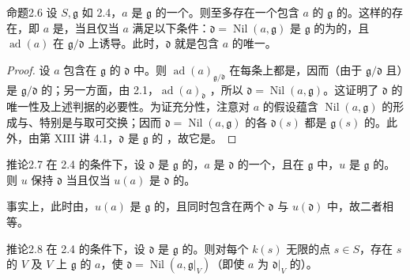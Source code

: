 \begin{SGAresult}{命题}{2.6}
设 $S,\mathfrak g$ 如 2.4，$a$ 是 $\mathfrak g$ 的一个。则至多存在一个包含 $a$ 的 $\mathfrak g$ 的。这样的存在，即 $a$ 是，当且仅当 $a$ 满足以下条件：$\mathfrak d=\operatorname{Nil}(a,\mathfrak g)$ 是 $\mathfrak g$ 的为的，且 $\operatorname{ad}(a)$ 在 $\mathfrak g/\mathfrak d$ 上诱导。此时，$\mathfrak d$ 就是包含 $a$ 的唯一。
\end{SGAresult}
\begin{proof}
设 $a$ 包含在 $\mathfrak g$ 的 $\mathfrak d$ 中。则 $\operatorname{ad}(a)_{\mathfrak g/\mathfrak d}$ 在每条上都是，因而（由于 $\mathfrak g/\mathfrak d$ 且）是 $\mathfrak g/\mathfrak d$ 的；另一方面，由 2.1，$\operatorname{ad}(a)_{\mathfrak d}$ ，所以 $\mathfrak d=\operatorname{Nil}(a,\mathfrak g)$。这证明了 $\mathfrak d$ 的唯一性及上述判据的必要性。为证充分性，注意对 $a$ 的假设蕴含 $\operatorname{Nil}(a,\mathfrak g)$ 的形成与、特别是与取可交换；因而 $\mathfrak d=\operatorname{Nil}(a,\mathfrak g)$ 的各 $\mathfrak d(s)$ 都是 $\mathfrak g(s)$ 的。此外，由第 XIII 讲 4.1，$\mathfrak d$ 是 $\mathfrak g$ 的 ，故它是。
\end{proof}
\begin{SGAresult}{推论}{2.7}
在 2.4 的条件下，设 $\mathfrak d$ 是 $\mathfrak g$ 的，$a$ 是 $\mathfrak d$ 的一个，且在 $\mathfrak g$ 中，$u$ 是 $\mathfrak g$ 的。则 $u$ 保持 $\mathfrak d$ 当且仅当 $u(a)$ 是 $\mathfrak d$ 的。
\end{SGAresult}
事实上，此时由，$u(a)$ 是 $\mathfrak g$ 的，且同时包含在两个 $\mathfrak d$ 与 $u(\mathfrak d)$ 中，故二者相等。
\begin{SGAresult}{推论}{2.8}
在 2.4 的条件下，设 $\mathfrak d$ 是 $\mathfrak g$ 的。则对每个 $k(s)$ 无限的点 $s\in S$，存在 $s$ 的 $V$ 及 $V$ 上 $\mathfrak g$ 的 $a$，使 $\mathfrak d=\operatorname{Nil}(a,\mathfrak g|_V)$（即使 $a$ 为 $\mathfrak d|_V$ 的）。
\end{SGAresult}
